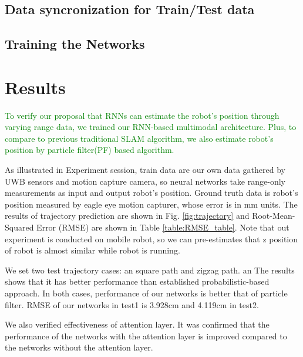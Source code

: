 \documentclass{ieeeaccess}
\begin{document}
\subsection{Data syncronization for Train/Test data}
\subsection{Training the Networks}


\section{Results}

\textcolor{green}{To verify our proposal that RNNs can estimate the robot's position through varying range data, we trained our RNN-based multimodal architecture. Plus, to compare to previous traditional SLAM algorithm, we also estimate robot's position by particle filter(PF) based algorithm.}

As illustrated in Experiment session, train data are our own data gathered by UWB sensors and motion capture camera, so neural networks take range-only measurements as input and output robot's position. Ground truth data is robot's position measured by eagle eye motion capturer, whose error is in mm units. The results of trajectory prediction are shown in Fig. \ref{fig:trajectory} and Root-Mean-Squared Error (RMSE) are shown in Table \ref{table:RMSE_table}. Note that out experiment is conducted on mobile robot, so we can pre-estimates that z position of robot is almost similar while robot is running. 

We set two test trajectory cases: an square path and zigzag path. an The results shows that it has better performance than established probabilistic-based approach. In both cases, performance of our networks  is better that of particle filter. RMSE of our networks in test1 is 3.928cm and 4.119cm in test2.

We also verified effectiveness of attention layer. It was confirmed that the performance of the networks with the attention layer is improved compared to the networks without the attention layer.
\end{document}
